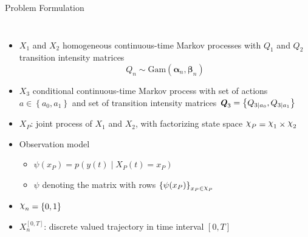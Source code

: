 \documentclass[
english,%
aspectratio=169,%
color={accentcolor=3b},
logo=true,%
colorframetitle=false,%
]{tudabeamer}
\DeclareRobustCommand{\rchi}{{\mathpalette\irchi\relax}}
\newcommand{\irchi}[2]{\raisebox{\depth}{$#1\chi$}}
\begin{document}
\begin{frame}{Problem Formulation}
\begin{columns}[onlytextwidth,c]
{
}
\begin{itemize}
	\item $ X_{1} $ and $ X_{2} $ homogeneous continuous-time Markov processes with $ Q_{1} $ and $ Q_{2} $ transition intensity matrices
	\vspace{-5pt}
	\begin{equation}
	Q_{n} \sim \mathrm{Gam}(\boldsymbol{\alpha}_{n}, \boldsymbol{\beta}_{n}) \nonumber
	\end{equation}
	\item $X_{3} $ conditional continuous-time Markov process  with set of actions $ a \in \left\lbrace a_{0}, a_{1}\right\rbrace  $ and set of transition intensity matrices $ \textbf{\textit{Q}}_{3} = \left\lbrace Q_{3\mid a_{0}}, Q_{3\mid a_{1}} \right\rbrace  $
	\item $ X_P $: joint process of $ X_1 $ and $ X_2 $, with factorizing state space $ \rchi_{P} = \rchi_1 \times \rchi_2 $
	\item Observation model
	\begin{itemize}
		\item $ \psi(x_P) = p(y(t) \mid X_{P}(t)=x_P) $
		\vspace{5pt}
		\item $ \psi $ denoting the matrix with rows $ \left\lbrace \psi(x_P)\right\rbrace_{x_P \in \rchi_P} $
	\end{itemize}
	\item $ \rchi_{n} = \left\lbrace 0,1\right\rbrace $
	\item $ X_{n}^{[0,T]} $: discrete valued trajectory in time interval $ [0, T] $
\end{itemize}
\end{columns}
\end{frame}
\end{document}
